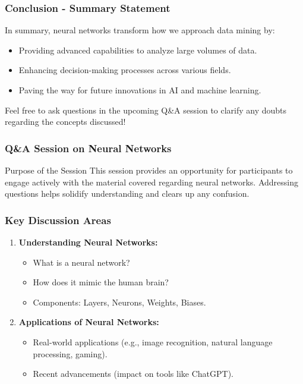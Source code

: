 \documentclass[aspectratio=169]{beamer}
\begin{document}
\begin{frame}[fragile]
    \frametitle{Conclusion - Summary Statement}
    In summary, neural networks transform how we approach data mining by:
    \begin{itemize}
        \item Providing advanced capabilities to analyze large volumes of data.
        \item Enhancing decision-making processes across various fields.
        \item Paving the way for future innovations in AI and machine learning.
    \end{itemize}
    
    Feel free to ask questions in the upcoming Q\&A session to clarify any doubts regarding the concepts discussed!
\end{frame}

\begin{frame}[fragile]
    \frametitle{Q\&A Session on Neural Networks}
    \begin{block}{Purpose of the Session}
        This session provides an opportunity for participants to engage actively with the material covered regarding neural networks. Addressing questions helps solidify understanding and clears up any confusion.
    \end{block}
\end{frame}

\begin{frame}[fragile]
    \frametitle{Key Discussion Areas}
    \begin{enumerate}
        \item \textbf{Understanding Neural Networks:}
        \begin{itemize}
            \item What is a neural network?
            \item How does it mimic the human brain?
            \item Components: Layers, Neurons, Weights, Biases.
        \end{itemize}

        \item \textbf{Applications of Neural Networks:}
        \begin{itemize}
            \item Real-world applications (e.g., image recognition, natural language processing, gaming).
            \item Recent advancements (impact on tools like ChatGPT).
        \end{itemize}
    \end{enumerate}
\end{frame}
\end{document}
